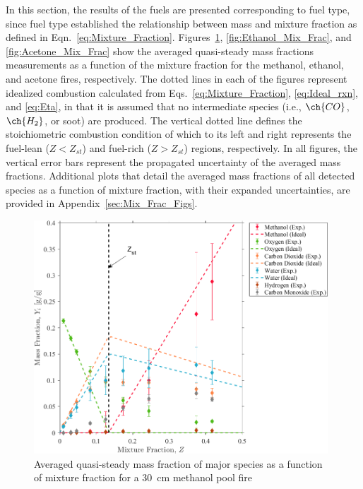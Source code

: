 \documentclass[12pt]{article}
\begin{document}
In this section, the results of the fuels are presented corresponding to fuel type, since fuel type established the relationship between mass and mixture fraction as defined in Eqn.~\ref{eq:Mixture_Fraction}. Figures~\ref{fig:Methanol_Mix_Frac}, \ref{fig:Ethanol_Mix_Frac}, and \ref{fig:Acetone_Mix_Frac} show the averaged quasi-steady mass fractions measurements as a function of the mixture fraction for the methanol, ethanol, and acetone fires, respectively. The dotted lines in each of the figures represent idealized combustion calculated from Eqs.~\ref{eq:Mixture_Fraction}, \ref{eq:Ideal_rxn}, and \ref{eq:Eta}, in that it is assumed that no intermediate species (i.e., $\ch{CO}$, $\ch{H_{2}}$, or soot) are produced. The vertical dotted line defines the stoichiometric combustion condition of which to its left and right represents the fuel-lean ($Z<Z_{st}$) and fuel-rich ($Z>Z_{st}$) regions, respectively. In all figures, the vertical error bars represent the propagated uncertainty of the averaged mass fractions. Additional plots that detail the averaged mass fractions of all detected species as a function of mixture fraction, with their expanded uncertainties, are provided in Appendix~\ref{sec:Mix_Frac_Figs}.

\begin{figure}[!]
	\centering
\includegraphics[width=11.0cm,keepaspectratio]{Methanol_OVERALL_Mass_Frac_Mix_Frac.png}
	\caption[Averaged quasi-steady mass fraction of major species as a function of mixture fraction for a \SI{30}{cm} methanol pool fire]{Averaged quasi-steady mass fraction of major species as a function of mixture fraction for a \SI{30}{cm} methanol pool fire}
	\label{fig:Methanol_Mix_Frac}
\end{figure}
\end{document}
